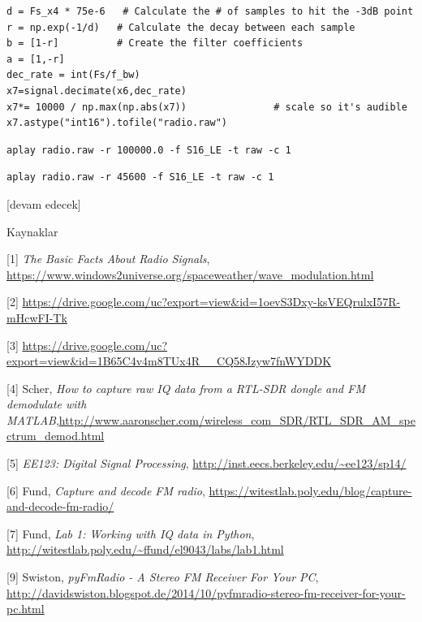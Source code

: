 \documentclass[12pt,fleqn]{article}\usepackage{../../common}
\begin{document}
\begin{verbatim}
d = Fs_x4 * 75e-6   # Calculate the # of samples to hit the -3dB point
r = np.exp(-1/d)   # Calculate the decay between each sample
b = [1-r]          # Create the filter coefficients
a = [1,-r]
dec_rate = int(Fs/f_bw)
x7=signal.decimate(x6,dec_rate)
x7*= 10000 / np.max(np.abs(x7))               # scale so it's audible
x7.astype("int16").tofile("radio.raw")
\end{verbatim}


\begin{verbatim}
aplay radio.raw -r 100000.0 -f S16_LE -t raw -c 1
\end{verbatim}

\begin{verbatim}
aplay radio.raw -r 45600 -f S16_LE -t raw -c 1
\end{verbatim}

[devam edecek]

Kaynaklar

[1] {\em The Basic Facts About Radio Signals}, \url{https://www.windows2universe.org/spaceweather/wave_modulation.html}

[2] \url{https://drive.google.com/uc?export=view&id=1oevS3Dxy-ksVEQrulxI57R-mHcwFI-Tk}

[3] \url{https://drive.google.com/uc?export=view&id=1B65C4v4m8TUx4R__CQ58Jzyw7fnWYDDK}

[4] Scher, {\em How to capture raw IQ data from a RTL-SDR dongle and FM demodulate with MATLAB},\url{http://www.aaronscher.com/wireless_com_SDR/RTL_SDR_AM_spectrum_demod.html}

[5] {\em EE123: Digital Signal Processing}, \url{http://inst.eecs.berkeley.edu/~ee123/sp14/}

[6] Fund, {\em Capture and decode FM radio}, \url{https://witestlab.poly.edu/blog/capture-and-decode-fm-radio/}

[7] Fund, {\em Lab 1: Working with IQ data in Python}, \url{http://witestlab.poly.edu/~ffund/el9043/labs/lab1.html}

[9] Swiston, {\em pyFmRadio - A Stereo FM Receiver For Your PC}, \url{http://davidswiston.blogspot.de/2014/10/pyfmradio-stereo-fm-receiver-for-your-pc.html}
\end{document}
